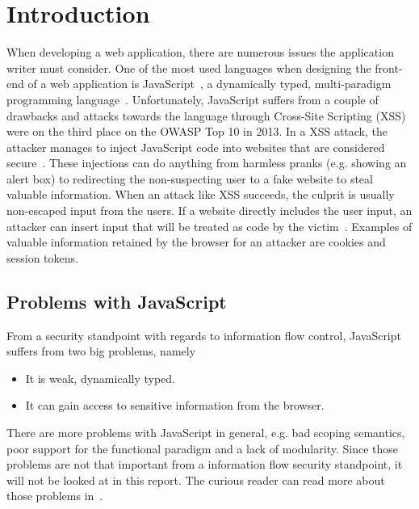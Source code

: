 \chapter{Introduction}
\label{chapter:intro}
When developing a web application, there are numerous issues the application writer must consider. One of the most used languages when designing the front-end of a web application is JavaScript~\cite{javascript_popularity}, a dynamically typed, multi-paradigm programming language~\cite{javascript_info}. Unfortunately, JavaScript suffers from a couple of drawbacks and attacks towards the language through Cross-Site Scripting (XSS) were on the third place on the OWASP Top 10 in 2013.\cite{owasp_xss_rank} In a XSS attack, the attacker manages to inject JavaScript code into websites that are considered secure~\cite{owasp_xss, excess_xss}. These injections can do anything from harmless pranks (e.g. showing an alert box) to redirecting the non-suspecting user to a fake website to steal valuable information. When an attack like XSS succeeds, the culprit is usually non-escaped input from the users. If a website directly includes the user input, an attacker can insert input that will be treated as code by the victim~\cite{excess_xss}. Examples of valuable information retained by the browser for an attacker are cookies and session tokens.
\section{Problems with JavaScript}
From a security standpoint with regards to information flow control, JavaScript suffers from two big problems, namely
\begin{itemize}
  \item It is weak, dynamically typed.
  \item It can gain access to sensitive information from the browser.
\end{itemize}
There are more problems with JavaScript in general, e.g. bad scoping semantics, poor support for the functional paradigm and a lack of modularity. Since those problems are not that important from a information flow security standpoint, it will not be looked at in this report. The curious reader can read more about those problems in~\cite{haste-lang}.

